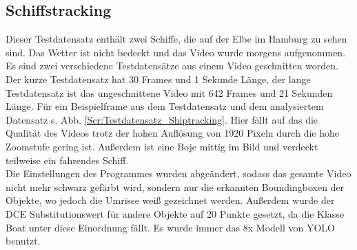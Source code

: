 \subsection{Schiffstracking \label{ev:shiptracking}}
{ 
	Dieser Testdatensatz enthält zwei Schiffe, die auf der Elbe im Hamburg zu sehen sind. Das Wetter ist nicht bedeckt und das Video wurde morgens aufgenommen. Es sind zwei verschiedene Testdatensätze aus einem Video geschnitten worden. Der kurze Testdatensatz hat 30 Frames und 1 Sekunde Länge, der lange Testdatensatz ist das ungeschnittene Video mit 642 Frames und 21 Sekunden Länge. Für ein Beispielframe aus dem Testdatensatz und dem analysiertem Datensatz s. Abb. \ref{Scr:Testdatensatz_Shiptracking}. Hier fällt auf das die Qualität des Videos trotz der hohen Auflösung von 1920  Pixeln durch die hohe Zoomstufe gering ist. Außerdem ist eine Boje mittig im Bild und verdeckt teilweise ein fahrendes Schiff. \\
	Die Einstellungen des Programmes wurden abgeändert, sodass das gesamte Video nicht mehr schwarz gefärbt wird, sondern nur die erkannten Boundingboxen der Objekte, wo jedoch die Umrisse weiß gezeichnet werden. Außerdem wurde der DCE Substitutionswert für andere Objekte auf 20 Punkte gesetzt, da die Klasse \glqq Boat\grqq{} unter diese Einordnung fällt. Es wurde immer das 8x Modell von YOLO benutzt. \\

}
